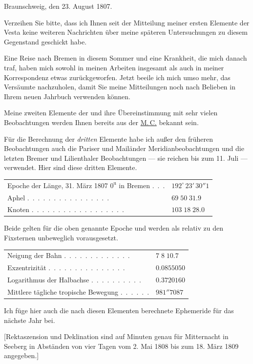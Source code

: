 \clearpage
{}
\hypertarget{native-289-lower}{}
\begin{flushright}
Braunschweig, den 23. August 1807.
\end{flushright}

\par\indent Verzeihen Sie bitte, dass ich Ihnen seit der Mitteilung meiner ersten Elemente der Vesta keine weiteren Nachrichten über meine späteren Untersuchungen zu diesem Gegenstand geschickt habe.
%
\par\indent Eine Reise nach Bremen in diesem Sommer und eine Krankheit, die mich danach traf, haben mich sowohl in meinen Arbeiten insgesamt als auch in meiner Korrespondenz etwas zurückgeworfen. Jetzt beeile ich mich umso mehr, das Versäumte nachzuholen, damit Sie meine Mitteilungen noch nach Belieben in Ihrem neuen Jahrbuch verwenden können.

\par\indent Meine zweiten Elemente der \VestaBodyTwoNinety{} und ihre Übereinstimmung mit sehr vielen Beobachtungen werden Ihnen bereits aus der \href{https://zs.thulb.uni-jena.de/rsc/viewer/jportal_derivate_00237836/Monatliche_Correspondenz_130168688_15_1807_0605.tif}{M.\,C.} bekannt sein.

\par\indent Für die Berechnung der \emph{dritten} Elemente habe ich außer den früheren Beobachtungen auch die Pariser und Mailänder Meridianbeobachtungen und die letzten Bremer und Lilienthaler Beobachtungen --- sie reichen bis zum 11. Juli --- verwendet. Hier sind diese dritten Elemente.

\begin{center}\begingroup\fontsize{9}{11}\selectfont
\begin{tabular}{ll}
\shortstack[l]{Epoche der Länge, 31. März 1807\\$0^{\text{u}}$ in Bremen} .\ .\ . & $192^\circ\,23'\,30''1$ \\
Aphel .\ .\ .\ .\ .\ .\ .\ .\ .\ .\ .\ .\ .\ .\ .\ . & $69\;50\;31.9$ \\
Knoten .\ .\ .\ .\ .\ .\ .\ .\ .\ .\ .\ .\ .\ .\ .\ .\ .\ . & $103\;18\;28.0$
\end{tabular}\endgroup\end{center}

\noindent Beide gelten für die oben genannte Epoche und werden als relativ zu den Fixsternen unbeweglich vorausgesetzt.

\begin{center}\begingroup\fontsize{9}{11}\selectfont
\begin{tabular}{ll}
Neigung der Bahn .\ .\ .\ .\ .\ .\ .\ .\ .\ .\ .\ .\ . & $7\;8\;10.7$ \\
Exzentrizität .\ .\ .\ .\ .\ .\ .\ .\ .\ .\ .\ .\ .\ .\ . & $0.0855050$ \\
Logarithmus der Halbachse .\ .\ .\ .\ .\ .\ .\ .\ .\ . & $0.3720160$ \\
Mittlere tägliche tropische Bewegung .\ .\ .\ .\ .\ . & $981''7087$
\end{tabular}\endgroup\end{center}

\par\indent Ich füge hier auch die nach diesen Elementen berechnete Ephemeride für das nächste Jahr bei.

[Rektaszension und Deklination sind auf Minuten genau für Mitternacht in Seeberg in Abständen von vier Tagen vom 2. Mai 1808 bis zum 18. März 1809 angegeben.]

